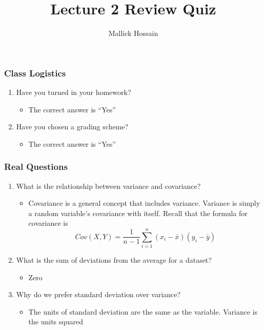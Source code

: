 \documentclass{beamer}
\title{Lecture 2 Review Quiz}
\author{Mallick Hossain}
\date{}
\institute{University of Pennsylvania}
\begin{document}
\begin{frame}
	\titlepage 
\end{frame} 

\begin{frame}
\frametitle{Class Logistics}
    \begin{enumerate}[<+- | alert@+>]
        \item Have you turned in your homework?
            \begin{itemize}
                \item The correct answer is ``Yes''
            \end{itemize}
        \item Have you chosen a grading scheme?
            \begin{itemize}
                \item The correct answer is ``Yes''
            \end{itemize}
    \end{enumerate}
\end{frame} 

\begin{frame}
\frametitle{Real Questions}
    \begin{enumerate}[<+- | alert@+>]
        \item What is the relationship between variance and covariance?
            \begin{itemize}
                \item Covariance is a general concept that includes variance. Variance is simply a random variable's covariance with itself. Recall that the formula for covariance is 
                $$
                Cov(X, Y) = \frac{1}{n - 1} \sum_{i = 1}^n (x_i - \bar{x})(y_i - \bar{y})
                $$
            \end{itemize}
        \item What is the sum of deviations from the average for a dataset?
        	\begin{itemize}
        		\item Zero
        	\end{itemize}
        \item Why do we prefer standard deviation over variance?
        	\begin{itemize}
        		\item The units of standard deviation are the same as the variable. Variance is the units squared
        	\end{itemize}
    \end{enumerate}
\end{frame} 
\end{document}
